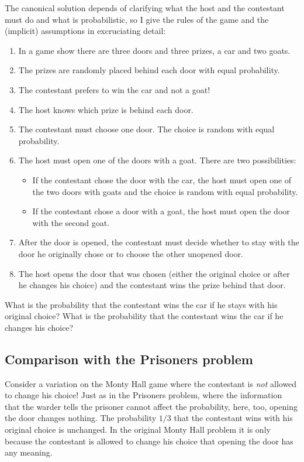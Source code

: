 \documentclass[11pt,a4paper]{article}
\begin{document}
The canonical solution depends of clarifying what the host and the contestant must do and what is probabilistic, so I give the rules of the game and the (implicit) assumptions in excruciating detail:
\begin{enumerate}
\item In a game show there are three doors and three prizes, a car and two goats.
\item The prizes are randomly placed behind each door with equal probability.
\item The contestant prefers to win the car and not a goat!
\item The host knows which prize is behind each door.
\item The contestant must choose one door. The choice is random with equal probability.
\item The host must open one of the doors with a goat. There are two possibilities:
\begin{itemize}
\item If the contestant chose the door with the car, the host must open one of the two doors with goats and the choice is random with equal probability.
\item If the contestant chose a door with a goat, the host must open the door with the second goat. 
\end{itemize}
\item After the door is opened, the contestant must decide whether to stay with the door he originally chose or to choose the other unopened door.
\item The host opens the door that was chosen (either the original choice or after he changes his choice) and the contestant wins the prize behind that door.
\end{enumerate}
What is the probability that the contestant wins the car if he stays with his original choice? What is the probability that the contestant wins the car if he changes his choice?

\subsection*{Comparison with the Prisoners problem}

Consider a variation on the Monty Hall game where the contestant is \emph{not} allowed to change his choice! Just as in the Prisoners problem, where the information that the warder tells the prisoner cannot affect the probability, here, too, opening the door changes nothing. The probability $1/3$ that the contestant wins with his original choice is unchanged. In the original Monty Hall problem it is only because the contestant is allowed to change his choice that opening the door has any meaning.
\end{document}
